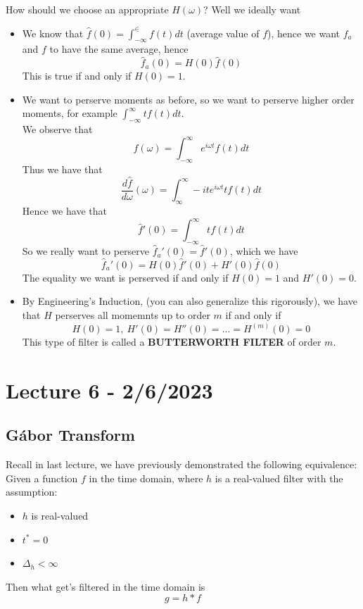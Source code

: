 \documentclass{article}
\begin{document}
How should we choose an appropriate $H(\omega)$? Well we ideally want
\begin{itemize}
    \item We know that $\widehat{f}(0) = \int_{-\infty}^\in f(t) dt$ (average value of $f$), hence we want $f_a$ and $f$ to have the same average, hence
    $$\widehat{f}_a(0) = H(0) \widehat{f}(0)$$
    This is true if and only if $H(0) = 1$.
    \item We want to perserve moments as before, so we want to perserve higher order moments, for example $\int_{-\infty}^\infty t f(t) dt$.\\
    We observe that
    \[\widehat{f}(\omega) = \int_{-\infty}^\infty e^{i\omega t} f(t) dt\]
    Thus we have that
    \[\frac{d\widehat{f}}{d\omega}(\omega) =\int_{\infty}^\infty -it e^{i\omega t} t f(t) dt\]
    Hence we have that
    \[\widehat{f}'(0) = \int_{-\infty}^\infty t f(t) dt\]
    So we really want to perserve $\widehat{f}_a'(0) = \widehat{f}'(0)$,  which we have
    \[\widehat{f}_a'(0) = H(0) \widehat{f}'(0) + H'(0) \widehat{f}(0)\]
    The equality we want is perserved if and only if $H(0) = 1$ and $H'(0) = 0$.
    \item By Engineering's Induction, (you can also generalize this rigorously), we have that $H$ perserves all momemnts up to order $m$ if and only if
    \[H(0) = 1,\ H'(0) = H''(0) = ... = H^{(m)}(0) = 0\]
    This type of filter is called a \textbf{BUTTERWORTH FILTER} of order $m$.
\end{itemize}

\newpage
\section{Lecture 6 - 2/6/2023}

\subsection{Gábor Transform}

Recall in last lecture, we have previously demonstrated the following equivalence:\\

Given a function $f$ in the time domain, where $h$ is a real-valued filter with the assumption:
\begin{itemize}
    \item $h$ is real-valued
    \item $t^* = 0$
    \item $\Delta_h < \infty$
\end{itemize}
Then what get's filtered in the time domain is
\[g = h * f\]
\end{document}
